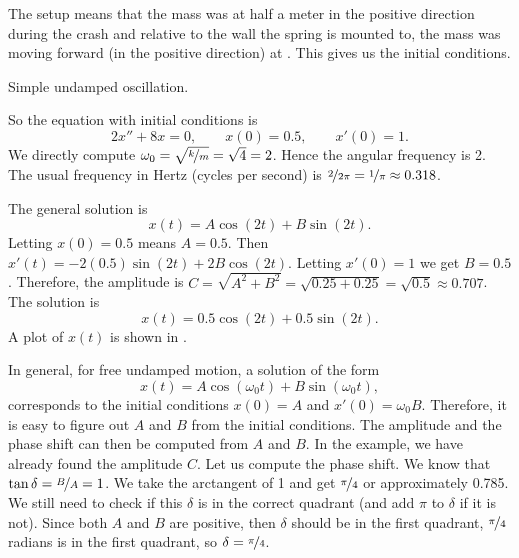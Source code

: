 \documentclass{ximera}
\begin{document}
\begin{exampleSol}
    The setup means that the mass was at half a meter in the positive direction during the crash and relative to the wall the spring is mounted to, the mass was moving forward (in the positive direction) at .  This gives us the initial conditions.
    
    \begin{mywrapfig}[15]{3.25in}
        \capstart
        \caption{Simple undamped oscillation.\label{mv:undampedfig}}
    \end{mywrapfig}
    
    So the equation with initial conditions is
    \begin{equation*}
        2 x'' + 8 x = 0 , \qquad x(0) = 0.5, \qquad x'(0) = 1.
    \end{equation*}
    We directly compute $\omega_0 = \sqrt{\nicefrac{k}{m}} = \sqrt{4} = 2$. Hence the angular frequency is 2.  The usual frequency in Hertz (cycles per second) is $\nicefrac{2}{2\pi} = \nicefrac{1}{\pi} \approx 0.318$.
    
    The general solution is
    \begin{equation*}
        x(t) = A \cos (2t) + B \sin (2t) .
    \end{equation*}
    Letting $x(0) = 0.5$ means $A = 0.5$.  Then $x'(t) = - 2(0.5) \sin (2t) + 2B \cos (2t)$. Letting $x'(0) = 1$ we get $B = 0.5$.  Therefore, the amplitude is $C = \sqrt{A^2+B^2} = \sqrt{0.25+0.25} = \sqrt{0.5} \approx 0.707$.  The solution is
    \begin{equation*}
        x(t) = 0.5 \cos (2t) + 0.5 \sin (2t) .
    \end{equation*}
    A plot of $x(t)$ is shown in .
\end{exampleSol}

In general, for free undamped motion, a solution of the form
\begin{equation*}
    x(t) = A \cos (\omega_0 t) + B \sin (\omega_0 t) ,
\end{equation*}
corresponds to the initial conditions $x(0) = A$ and $x'(0) = \omega_0 B$. Therefore, it is easy to figure out $A$ and $B$ from the initial conditions. The amplitude and the phase shift can then be computed from $A$ and $B$. In the example, we have already found the amplitude $C$.  Let us compute the phase shift.  We know that $\tan \delta = \nicefrac{B}{A} = 1$.  We take the arctangent of 1 and get $\nicefrac{\pi}{4}$ or approximately 0.785. We still need to check if this $\delta$ is in the correct quadrant (and add $\pi$ to $\delta$ if it is not). Since both $A$ and $B$ are positive, then $\delta$ should be in the first quadrant, $\nicefrac{\pi}{4}$ radians is in the first quadrant, so $\delta = \nicefrac{\pi}{4}$.
\end{document}
